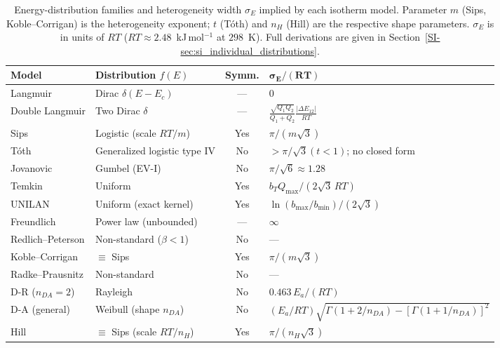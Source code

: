 \documentclass[journal=jacsat,manuscript=article]{achemso}
\begin{document}
	\begin{table}[H]
		\small
		\caption{Energy-distribution families and heterogeneity width $\sigma_E$ implied by each isotherm model. Parameter $m$ (Sips, Koble--Corrigan) is the heterogeneity exponent; $t$ (T\'{o}th) and $n_H$ (Hill) are the respective shape parameters. $\sigma_E$ is in units of $RT$ ($RT\approx 2.48$~kJ\,mol$^{-1}$ at $298$~K). Full derivations are given in Section~\ref{SI-sec:si_individual_distributions}.}
		\label{tab:energy_distributions}
		\renewcommand{\arraystretch}{1.4}
		\begin{tabular}{@{} l l c l @{}}
			\hline
			\textbf{Model}
			& \textbf{Distribution $f(E)$}
			& \textbf{Symm.}
			& $\boldsymbol{\sigma_E/(RT)}$ \\
			\hline
			Langmuir
			& Dirac $\delta(E-E_c)$
			& ---
			& $0$ \\
			Double Langmuir
			& Two Dirac $\delta$
			& ---
			& $\tfrac{\sqrt{Q_1 Q_2}}{Q_1+Q_2}\tfrac{|\Delta E_{12}|}{RT}$ \\
			Sips
			& Logistic (scale $RT/m$)
			& Yes
			& $\pi/(m\sqrt{3})$ \\
			T\'{o}th
			& Generalized logistic type IV
			& No
			& $>\pi/\sqrt{3}$\;$(t<1)$; no closed form \\
			Jovanovic
			& Gumbel (EV-I)
			& No
			& $\pi/\sqrt{6}\approx 1.28$ \\
			Temkin
			& Uniform
			& Yes
			& $b_T Q_{\max}/(2\sqrt{3}\,RT)$ \\
			UNILAN
			& Uniform (exact kernel)
			& Yes
			& $\ln(b_{\max}/b_{\min})/(2\sqrt{3})$ \\
			Freundlich
			& Power law (unbounded)
			& ---
			& $\infty$ \\
			Redlich--Peterson
			& Non-standard ($\beta < 1$)
			& No
			& --- \\
			Koble--Corrigan
			& $\equiv$ Sips
			& Yes
			& $\pi/(m\sqrt{3})$ \\
			Radke--Prausnitz
			& Non-standard
			& No
			& --- \\
			D-R ($n_{DA}=2$)
			& Rayleigh
			& No
			& $0.463\,E_a/(RT)$ \\
			D-A (general)
			& Weibull (shape $n_{DA}$)
			& No
			& $(E_a/RT)\sqrt{\Gamma(1+2/n_{DA})-[\Gamma(1+1/n_{DA})]^2}$ \\
			Hill
			& $\equiv$ Sips (scale $RT/n_H$)
			& Yes
			& $\pi/(n_H\sqrt{3})$ \\
			\hline
		\end{tabular}
	\end{table}
	
\end{document}
